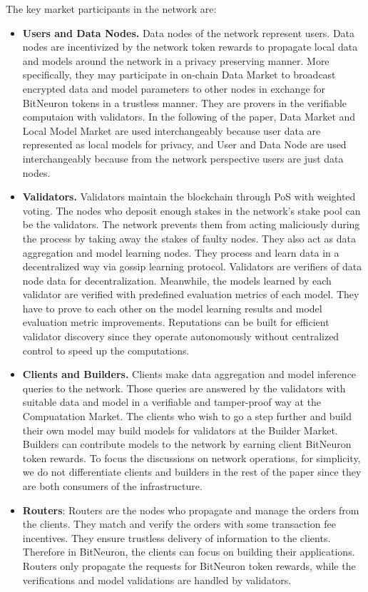\documentclass[11pt,letterpaper]{article}
\begin{document}
The key market participants in the network are:
\begin{itemize}
    \item \textbf{Users and Data Nodes.} Data nodes of the network represent users. Data nodes are incentivized by the network token rewards to propagate local data and models around the network in a privacy preserving manner. More specifically, they may participate in on-chain Data Market to broadcast encrypted data and model parameters to other nodes in exchange for BitNeuron tokens in a trustless manner. They are provers in the verifiable computaion with validators. In the following of the paper, Data Market and Local Model Market are used interchangeably because user data are represented as local models for privacy, and User and Data Node are used interchangeably because from the network perspective users are just data nodes.
    
    \item \textbf{Validators.} Validators maintain the blockchain through PoS with weighted voting. The nodes who deposit enough stakes in the network's stake pool can be the validators. The network prevents them from acting maliciously during the process by taking away the stakes of faulty nodes. They also act as data aggregation and model learning nodes. They process and learn data in a decentralized way via gossip learning protocol. Validators are verifiers of data node data for decentralization. Meanwhile, the models learned by each validator are verified with predefined evaluation metrics of each model. They have to prove to each other on the model learning results and model evaluation metric improvements. Reputations can be built for efficient validator discovery since they operate autonomously without centralized control to speed up the computations.
    
    \item \textbf{Clients and Builders.} Clients make data aggregation and model inference queries to the network. Those queries are answered by the validators with suitable data and model in a verifiable and tamper-proof way at the Compuatation Market. The clients who wish to go a step further and build their own model may build models for validators at the Builder Market. Builders can contribute models to the network by earning client BitNeuron token rewards. To focus the discussions on network operations, for simplicity, we do not differentiate clients and builders in the rest of the paper since they are both consumers of the infrastructure.
    
    \item \textbf{Routers}: Routers are the nodes who propagate and manage the orders from the clients. They match and verify the orders with some transaction fee incentives. They ensure trustless delivery of information to the clients. Therefore in BitNeuron, the clients can focus on building their applications. Routers only propagate the requests for BitNeuron token rewards, while the verifications and model validations are handled by validators.
\end{itemize}
\end{document}
